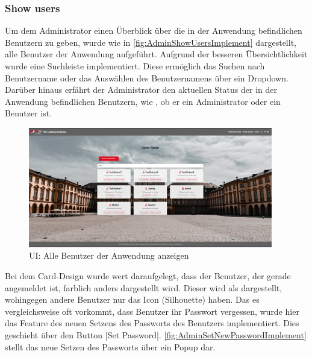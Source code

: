 \subsubsection*{Show users \faUsers}

Um dem Administrator einen Überblick über die in der Anwendung befindlichen Benutzern zu geben, wurde wie in \abb \vref{fig:AdminShowUsersImplement} dargestellt, alle Benutzer der Anwendung aufgeführt.
Aufgrund der besseren Übersichtlichkeit wurde eine Suchleiste implementiert. 
Diese ermöglich das Suchen nach Benutzername oder das Auswählen des Benutzernamens über ein Dropdown. 
Darüber hinaus erfährt der Administrator den aktuellen Status der in der Anwendung befindlichen Benutzern, wie \zb, ob er ein Administrator oder ein Benutzer ist.

\begin{figure}[H]
	\centering
	\includegraphics[width=0.95\textwidth, keepaspectratio]{img/client/AdminShowUsers.png}
	\captionsetup{justification=centering, format=plain}
	\caption[\acf{UI}: Alle Benutzer der Anwendung anzeigen]{\acf{UI}: Alle Benutzer der Anwendung anzeigen \\ \quelleScreenshot}
	\label{fig:AdminShowUsersImplement}
\end{figure}

Bei dem Card-Design wurde wert daraufgelegt, dass der Benutzer, der gerade angemeldet ist, farblich anders dargestellt wird. 
Dieser wird als \faUser\xspace dargestellt, wohingegen andere Benutzer nur das Icon \faUser[regular]\xspace (Silhouette) haben. \newline
Das es vergleichsweise oft vorkommt, dass Benutzer ihr Passwort vergessen\autocite[vgl.][]{statistaPasswortVergessen}, wurde hier das Feature des neuen Setzens des Passworts des Benutzers implementiert. 
Dies geschieht über den Button \jinline|Set Password|. \abb \vref{fig:AdminSetNewPasswordImplement} stellt das neue Setzen des Passworts über ein Popup dar.

